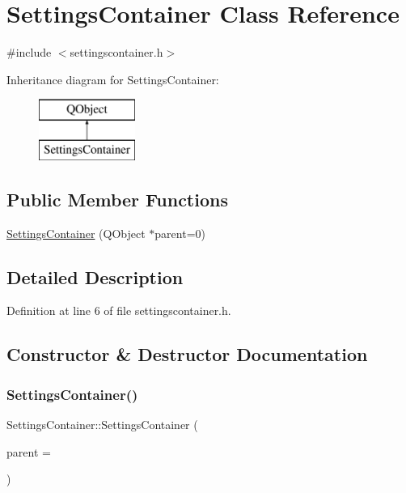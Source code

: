 \hypertarget{class_settings_container}{}\section{Settings\+Container Class Reference}
\label{class_settings_container}


{\ttfamily \#include $<$settingscontainer.\+h$>$}

Inheritance diagram for Settings\+Container\+:\begin{figure}[H]
\begin{center}
\leavevmode
\includegraphics[height=2.000000cm]{class_settings_container}
\end{center}
\end{figure}
\subsection*{Public Member Functions}
\begin{DoxyCompactItemize}
\item 
\hyperlink{class_settings_container_aadc591433bbbdd60eee071ce80fac655}{Settings\+Container} (Q\+Object $\ast$parent=0)
\end{DoxyCompactItemize}


\subsection{Detailed Description}


Definition at line 6 of file settingscontainer.\+h.



\subsection{Constructor \& Destructor Documentation}
\mbox{\label{class_settings_container_aadc591433bbbdd60eee071ce80fac655}} 
\subsubsection{\texorpdfstring{Settings\+Container()}{SettingsContainer()}}
{\footnotesize\ttfamily Settings\+Container\+::\+Settings\+Container (\begin{DoxyParamCaption}\item[{Q\+Object $\ast$}]{parent = {} }\end{DoxyParamCaption})\hspace{0.3cm}{\ttfamily [explicit]}}



